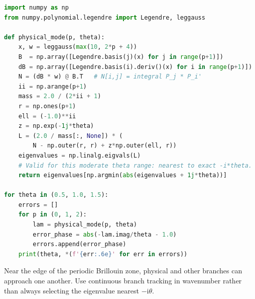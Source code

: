 \documentclass[11pt,openany]{book}
\numberwithin{equation}{chapter}
\theoremstyle{definition}
\theoremstyle{remark}
\begin{document}
\begin{lstlisting}[language=Python,caption={Spatial dispersion of Legendre modal DG: physical-eigenvalue analysis}]
import numpy as np
from numpy.polynomial.legendre import Legendre, leggauss

def physical_mode(p, theta):
    x, w = leggauss(max(10, 2*p + 4))
    B  = np.array([Legendre.basis(j)(x) for j in range(p+1)])
    dB = np.array([Legendre.basis(i).deriv()(x) for i in range(p+1)])
    N = (dB * w) @ B.T   # N[i,j] = integral P_j * P_i'
    ii = np.arange(p+1)
    mass = 2.0 / (2*ii + 1)
    r = np.ones(p+1)
    ell = (-1.0)**ii
    z = np.exp(-1j*theta)
    L = (2.0 / mass[:, None]) * (
        N - np.outer(r, r) + z*np.outer(ell, r))
    eigenvalues = np.linalg.eigvals(L)
    # Valid for this moderate theta range: nearest to exact -i*theta.
    return eigenvalues[np.argmin(abs(eigenvalues + 1j*theta))]

for theta in (0.5, 1.0, 1.5):
    errors = []
    for p in (0, 1, 2):
        lam = physical_mode(p, theta)
        error_phase = abs(-lam.imag/theta - 1.0)
        errors.append(error_phase)
    print(theta, *(f'{err:.6e}' for err in errors))
\end{lstlisting}
Near the edge of the periodic Brillouin zone, physical and other branches can approach one another.
Use continuous branch tracking in wavenumber rather than always selecting the eigenvalue nearest $-\mathrm i\theta$.
\end{document}
